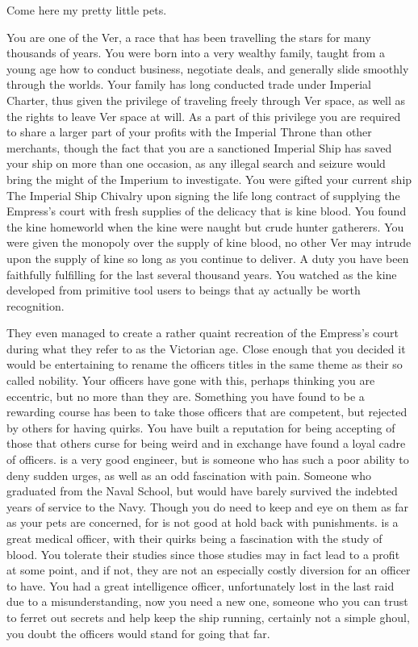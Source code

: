 \documentclass[char]{guildcamp4}
\begin{document}
\name{\cVone{}}


Come here my pretty little pets.

You are one of the Ver, a race that has been travelling the stars for many thousands of years. You were born into a very wealthy family, taught from a young age how to conduct business, negotiate deals, and generally slide smoothly through the worlds. Your family has long conducted trade under Imperial Charter, thus given the privilege of traveling freely through Ver space, as well as the rights to leave Ver space at will. As a part of this privilege you are required to share a larger part of your profits with the Imperial Throne than other merchants, though the fact that you are a sanctioned Imperial Ship has saved your ship on more than one occasion, as any illegal search and seizure would bring the might of the Imperium to investigate. You were gifted your current ship The Imperial Ship Chivalry upon signing the life long contract of supplying the Empress's court with fresh supplies of the delicacy that is kine blood. You found the kine homeworld when the kine were naught but crude hunter gatherers. You were given the monopoly over the supply of kine blood, no other Ver may intrude upon the supply of kine so long as you continue to deliver.  A duty you have been faithfully fulfilling for the last several thousand years. You watched as the kine developed from primitive tool users to beings that ay actually be worth recognition. 

They even managed to create a rather quaint recreation of the Empress's court during what they refer to as the Victorian age. Close enough that you decided it would be entertaining to rename the officers titles in the same theme as their so called nobility. Your officers have gone with this, perhaps thinking you are eccentric, but no more than they are. Something you have found to be a rewarding course has been to take those officers that are competent, but rejected by others for having quirks. You have built a reputation for being accepting of those that others curse for being weird and in exchange have found a loyal cadre of officers.\cVtwo{} is a very good engineer, but is someone who has such a poor ability to deny sudden urges, as well as an odd fascination with pain. Someone who graduated from the Naval School, but would have barely survived the indebted years of service to the Navy. Though you do need to keep and eye on them as far as your pets are concerned, for \cVtwo{} is not good at hold back with punishments. \cVthree{} is a great medical officer, with their quirks being a fascination with the study of blood. You tolerate their studies since those studies may in fact lead to a profit at some point, and if not, they are not an especially costly diversion for an officer to have. You had a great intelligence officer, unfortunately lost in the last raid due to a misunderstanding, now you need a new one, someone who you can trust to ferret out secrets and help keep the ship running, certainly not a simple ghoul, you doubt the officers would stand for going that far.
\end{document}
